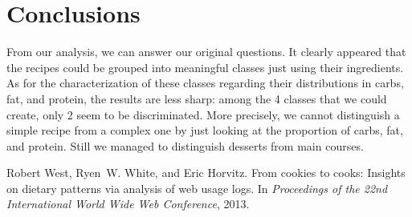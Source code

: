 \documentclass[11pt]{article}
\begin{document}
\section{Conclusions}
From our analysis, we can answer our original questions. It clearly appeared that the recipes could be grouped into meaningful classes just using their ingredients. As for the characterization of these classes regarding their distributions in carbs, fat, and protein, the results are less sharp: among the 4 classes that we could create, only 2 seem to be discriminated. More precisely, we cannot distinguish a simple recipe from a complex one by just looking at the proportion of carbs, fat, and protein. Still we managed to distinguish desserts from main courses.

\begin{thebibliography}{}
	
	Robert West, Ryen~W. White, and Eric Horvitz.
	\newblock From cookies to cooks: Insights on dietary patterns via analysis of
	web usage logs.
	\newblock In {\em Proceedings of the 22nd International World Wide Web
		Conference}, 2013.
	
\end{thebibliography}
\end{document}
